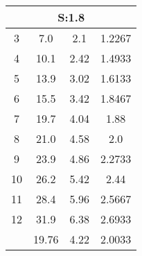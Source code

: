 
\begin{table}[H]
\begin{tabular}{c|ccc}
\multicolumn{4}{c}{S:1.8}\\\hline
3 & 7.0 & 2.1 & 1.2267\\
4 & 10.1 & 2.42 & 1.4933\\
5 & 13.9 & 3.02 & 1.6133\\
6 & 15.5 & 3.42 & 1.8467\\
7 & 19.7 & 4.04 & 1.88\\
8 & 21.0 & 4.58 & 2.0\\
9 & 23.9 & 4.86 & 2.2733\\
10 & 26.2 & 5.42 & 2.44\\
11 & 28.4 & 5.96 & 2.5667\\
12 & 31.9 & 6.38 & 2.6933\\
\hline
& 19.76 & 4.22 & 2.0033\\
\end{tabular}
\end{table}